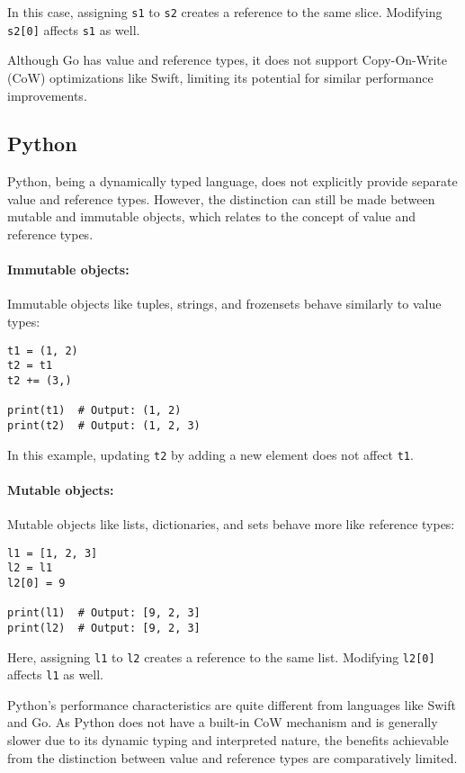 In this case, assigning \texttt{s1} to \texttt{s2} creates a reference to the same slice. Modifying \texttt{s2[0]} affects \texttt{s1} as well.

Although Go has value and reference types, it does not support Copy-On-Write (CoW) optimizations like Swift, limiting its potential for similar performance improvements.

\subsection{Python}

Python, being a dynamically typed language, does not explicitly provide separate value and reference types. However, the distinction can still be made between mutable and immutable objects, which relates to the concept of value and reference types.

\paragraph{Immutable objects:}
Immutable objects like tuples, strings, and frozensets behave similarly to value types:

\begin{verbatim}
t1 = (1, 2)
t2 = t1
t2 += (3,)

print(t1)  # Output: (1, 2)
print(t2)  # Output: (1, 2, 3)
\end{verbatim}

In this example, updating \texttt{t2} by adding a new element does not affect \texttt{t1}.

\paragraph{Mutable objects:}
Mutable objects like lists, dictionaries, and sets behave more like reference types:

\begin{verbatim}
l1 = [1, 2, 3]
l2 = l1
l2[0] = 9

print(l1)  # Output: [9, 2, 3]
print(l2)  # Output: [9, 2, 3]
\end{verbatim}

Here, assigning \texttt{l1} to \texttt{l2} creates a reference to the same list. Modifying \texttt{l2[0]} affects \texttt{l1} as well.

Python's performance characteristics are quite different from languages like Swift and Go. As Python does not have a built-in CoW mechanism and is generally slower due to its dynamic typing and interpreted nature, the benefits achievable from the distinction between value and reference types are comparatively limited.

